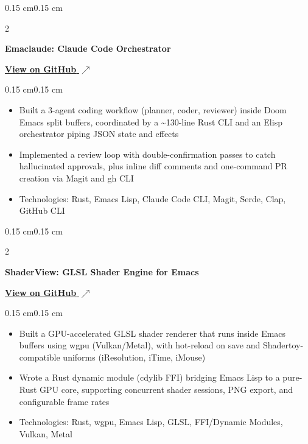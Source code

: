 \documentclass[10pt, letterpaper]{article}
\newcommand{\githublink}[2]{\href{#1}{#2 $\nearrow$}}
\newenvironment{highlights}{
    \begin{itemize}[
        topsep=0.08 cm,
        parsep=0.05 cm,
        partopsep=0pt,
        itemsep=0pt,
        leftmargin=0.4 cm
    ]
}{
    \end{itemize}
}
\newenvironment{onecolentry}{
    \begin{adjustwidth}{0.15 cm}{0.15 cm}
}{
    \end{adjustwidth}
}
\newenvironment{twocolentry}[2][]{
    \onecolentry
    \def\secondColumn{#2}
    \setcolumnwidth{\fill, 4.5 cm}
    \begin{paracol}{2}
}{
    \switchcolumn \raggedleft \secondColumn
    \end{paracol}
    \endonecolentry
}
\begin{document}
        \vspace{0.15 cm}

        \begin{twocolentry}{
            \githublink{https://github.com/yuann3/emaclaude}{\textbf{View on GitHub}}
        }
            \textbf{Emaclaude: Claude Code Orchestrator}
        \end{twocolentry}
        \vspace{0.08 cm}
        \begin{onecolentry}
            \begin{highlights}
                \item Built a 3-agent coding workflow (planner, coder, reviewer) inside Doom Emacs split buffers, coordinated by a \textasciitilde130-line Rust CLI and an Elisp orchestrator piping JSON state and effects
                \item Implemented a review loop with double-confirmation passes to catch hallucinated approvals, plus inline diff comments and one-command PR creation via Magit and gh CLI
                \item Technologies: Rust, Emacs Lisp, Claude Code CLI, Magit, Serde, Clap, GitHub CLI
            \end{highlights}
        \end{onecolentry}

        \vspace{0.15 cm}

        \begin{twocolentry}{
            \githublink{https://github.com/yuann3/shaderview}{\textbf{View on GitHub}}
        }
            \textbf{ShaderView: GLSL Shader Engine for Emacs}
        \end{twocolentry}
        \vspace{0.08 cm}
        \begin{onecolentry}
            \begin{highlights}
                \item Built a GPU-accelerated GLSL shader renderer that runs inside Emacs buffers using wgpu (Vulkan/Metal), with hot-reload on save and Shadertoy-compatible uniforms (iResolution, iTime, iMouse)
                \item Wrote a Rust dynamic module (cdylib FFI) bridging Emacs Lisp to a pure-Rust GPU core, supporting concurrent shader sessions, PNG export, and configurable frame rates
                \item Technologies: Rust, wgpu, Emacs Lisp, GLSL, FFI/Dynamic Modules, Vulkan, Metal
            \end{highlights}
        \end{onecolentry}
\end{document}
